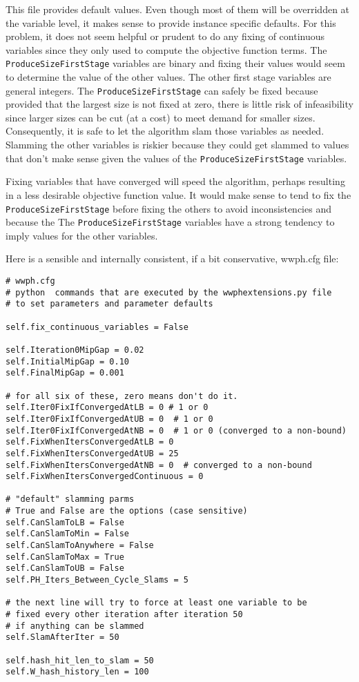 This file provides default values. Even though most of them will be overridden at the variable level, it makes sense
to provide instance specific defaults. For this problem, it does not seem helpful or prudent to do any fixing of continuous
variables since they only used to compute the objective function terms. The \verb|ProduceSizeFirstStage| variables are binary
and fixing their values would seem to determine the value of the other values. The other first stage variables are general integers. The \verb|ProduceSizeFirstStage| can safely be fixed because provided that the largest size is not fixed at zero, there is little risk of infeasibility since larger sizes can be cut (at a cost) to meet demand for smaller sizes. Consequently, it is safe to let the algorithm slam those
variables as needed. Slamming the other variables is riskier because they could get slammed to values that don't make
sense given the values of the \verb|ProduceSizeFirstStage| variables.

Fixing variables that have converged will speed the algorithm, perhaps resulting in a less desirable
objective function value. It would make sense to tend to fix the \verb|ProduceSizeFirstStage| before fixing the others to avoid
inconsistencies and because the The \verb|ProduceSizeFirstStage| variables have a strong tendency to imply values for the other
variables.

Here is a sensible and internally consistent, if a bit conservative, wwph.cfg file:

{\small
\begin{verbatim}
# wwph.cfg
# python  commands that are executed by the wwphextensions.py file
# to set parameters and parameter defaults

self.fix_continuous_variables = False

self.Iteration0MipGap = 0.02
self.InitialMipGap = 0.10
self.FinalMipGap = 0.001

# for all six of these, zero means don't do it.
self.Iter0FixIfConvergedAtLB = 0 # 1 or 0
self.Iter0FixIfConvergedAtUB = 0  # 1 or 0
self.Iter0FixIfConvergedAtNB = 0  # 1 or 0 (converged to a non-bound)
self.FixWhenItersConvergedAtLB = 0
self.FixWhenItersConvergedAtUB = 25
self.FixWhenItersConvergedAtNB = 0  # converged to a non-bound
self.FixWhenItersConvergedContinuous = 0
      
# "default" slamming parms 
# True and False are the options (case sensitive)
self.CanSlamToLB = False
self.CanSlamToMin = False
self.CanSlamToAnywhere = False
self.CanSlamToMax = True
self.CanSlamToUB = False
self.PH_Iters_Between_Cycle_Slams = 5

# the next line will try to force at least one variable to be
# fixed every other iteration after iteration 50
# if anything can be slammed
self.SlamAfterIter = 50

self.hash_hit_len_to_slam = 50
self.W_hash_history_len = 100
\end{verbatim}
}

